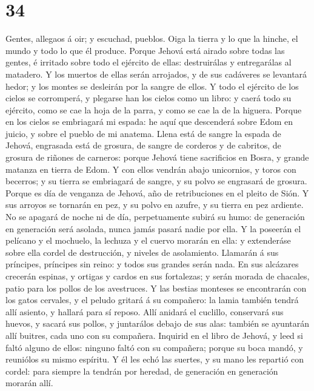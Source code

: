 \hypertarget{section-33}{%
\section{34}\label{section-33}}

 Gentes, allegaos á oir; y escuchad, pueblos. Oiga la tierra
y lo que la hinche, el mundo y todo lo que él produce. 
Porque Jehová está airado sobre todas las gentes, é irritado sobre todo
el ejército de ellas: destruirálas y entregarálas al matadero.
 Y los muertos de ellas serán arrojados, y de sus cadáveres
se levantará hedor; y los montes se desleirán por la sangre de ellos.
 Y todo el ejército de los cielos se corromperá, y plegarse
han los cielos como un libro: y caerá todo su ejército, como se cae la
hoja de la parra, y como se cae la de la higuera.  Porque en
los cielos se embriagará mi espada: he aquí que descenderá sobre Edom en
juicio, y sobre el pueblo de mi anatema.  Llena está de
sangre la espada de Jehová, engrasada está de grosura, de sangre de
corderos y de cabritos, de grosura de riñones de carneros: porque Jehová
tiene sacrificios en Bosra, y grande matanza en tierra de Edom.
 Y con ellos vendrán abajo unicornios, y toros con becerros;
y su tierra se embriagará de sangre, y su polvo se engrasará de grosura.
 Porque es día de venganza de Jehová, año de retribuciones
en el pleito de Sión.  Y sus arroyos se tornarán en pez, y
su polvo en azufre, y su tierra en pez ardiente.  No se
apagará de noche ni de día, perpetuamente subirá su humo: de generación
en generación será asolada, nunca jamás pasará nadie por ella.
 Y la poseerán el pelícano y el mochuelo, la lechuza y el
cuervo morarán en ella: y extenderáse sobre ella cordel de destrucción,
y niveles de asolamiento.  Llamarán á sus príncipes,
príncipes sin reino: y todos sus grandes serán nada.  En
sus alcázares crecerán espinas, y ortigas y cardos en sus fortalezas; y
serán morada de chacales, patio para los pollos de los avestruces.
 Y las bestias monteses se encontrarán con los gatos
cervales, y el peludo gritará á su compañero: la lamia también tendrá
allí asiento, y hallará para sí reposo.  Allí anidará el
cuclillo, conservará sus huevos, y sacará sus pollos, y juntarálos
debajo de sus alas: también se ayuntarán allí buitres, cada uno con su
compañera.  Inquirid en el libro de Jehová, y leed si faltó
alguno de ellos: ninguno faltó con su compañera; porque su boca mandó, y
reuniólos su mismo espíritu.  Y él les echó las suertes, y
su mano les repartió con cordel: para siempre la tendrán por heredad, de
generación en generación morarán allí.

